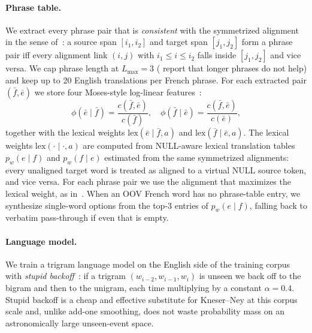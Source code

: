 \documentclass[11pt]{article}
\begin{document}
\paragraph{Phrase table.} We extract every phrase pair that is \emph{consistent} with the symmetrized alignment in the sense of~\citet{och-etal-1999-improved}: a source span $[i_1, i_2]$ and target span $[j_1, j_2]$ form a phrase pair iff every alignment link $(i, j)$ with $i_1 \le i \le i_2$ falls inside $[j_1, j_2]$ and vice versa. We cap phrase length at $L_{\max} = 3$ (\citet{koehn-etal-2003-statistical} report that longer phrases do not help) and keep up to 20 English translations per French phrase. For each extracted pair $(\bar{f}, \bar{e})$ we store four Moses-style log-linear features~\cite{koehn-etal-2003-statistical,koehn-2004-pharaoh}:
\begin{equation*}
\phi(\bar{e} \mid \bar{f}) = \frac{c(\bar{f}, \bar{e})}{c(\bar{f})}, \quad
\phi(\bar{f} \mid \bar{e}) = \frac{c(\bar{f}, \bar{e})}{c(\bar{e})},
\end{equation*}
together with the lexical weights $\mathrm{lex}(\bar{e} \mid \bar{f}, a)$ and $\mathrm{lex}(\bar{f} \mid \bar{e}, a)$.
The lexical weights $\mathrm{lex}(\cdot \mid \cdot, a)$ are computed from NULL-aware lexical translation tables $p_w(e \mid f)$ and $p_w(f \mid e)$ estimated from the same symmetrized alignments: every unaligned target word is treated as aligned to a virtual NULL source token, and vice versa. For each phrase pair we use the alignment that maximizes the lexical weight, as in~\citet{koehn-etal-2003-statistical}. When an OOV French word has no phrase-table entry, we synthesize single-word options from the top-3 entries of $p_w(e \mid f)$, falling back to verbatim pass-through if even that is empty.

\paragraph{Language model.} We train a trigram language model on the English side of the training corpus with \emph{stupid backoff}~\cite{brants-etal-2007-large}: if a trigram $(w_{i-2}, w_{i-1}, w_i)$ is unseen we back off to the bigram and then to the unigram, each time multiplying by a constant $\alpha = 0.4$. Stupid backoff is a cheap and effective substitute for Kneser--Ney at this corpus scale and, unlike add-one smoothing, does not waste probability mass on an astronomically large unseen-event space.
\end{document}
